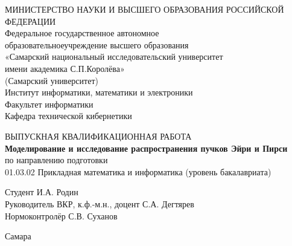\begin{titlepage}
							
	\center
							
							
{МИНИСТЕРСТВО НАУКИ И ВЫСШЕГО ОБРАЗОВАНИЯ РОССИЙСКОЙ ФЕДЕРАЦИИ\\
{Федеральное государственное автономное  \\[-0.2cm] 
образовательноеучреждение  высшего образования\\[-0.2cm] 
«Самарский национальный исследовательский университет \\[-0.2cm] 
имени академика С.П.Королёва»\\[-0.2cm]
(Самарский университет)}\\[0.7cm]
{Институт информатики, математики и электроники}\\[-0.2cm]
{Факультет информатики}\\[-0.2cm]
{Кафедра технической кибернетики}\\[2cm]
}
						
							
	\vfill\vfill


    \vfill
  
  \begin{center}
  ВЫПУСКНАЯ КВАЛИФИКАЦИОННАЯ РАБОТА \\[1cm]
  \textbf{\large Моделирование и исследование  распространения пучков Эйри и Пирси} \\[1cm]
  по направлению подготовки\\[-0.2cm]
  01.03.02  Прикладная математика и информатика (уровень бакалавриата)\\[2cm]
  \end{center}
  
  \begin{minipage}{0.8\textwidth}
  Студент 	\hfill	И.А. Родин \\
Руководитель ВКР, к.ф.-м.н., доцент \hfill  С.А. Дегтярев\\
Нормоконтролёр 		\hfill С.В. Суханов\\
  \end{minipage}

	\vfill\vfill\vfill
					
	{\centering Самара \the\year}
							
							
\end{titlepage}

